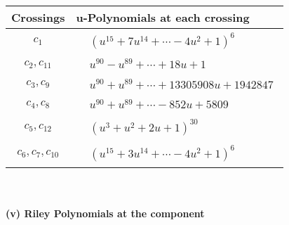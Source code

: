 \documentclass[1p]{elsarticle_modified}
\theoremstyle{definition}
\begin{document}
\begin{tabular}{m{50pt}|m{274pt}}
Crossings & \hspace{64pt}u-Polynomials at each crossing \\
\hline $$\begin{aligned}c_{1}\end{aligned}$$&$\begin{aligned}
&(u^{15}+7 u^{14}+\cdots-4 u^2+1)^{6}
\end{aligned}$\\
\hline $$\begin{aligned}c_{2},c_{11}\end{aligned}$$&$\begin{aligned}
&u^{90}- u^{89}+\cdots+18 u+1
\end{aligned}$\\
\hline $$\begin{aligned}c_{3},c_{9}\end{aligned}$$&$\begin{aligned}
&u^{90}+u^{89}+\cdots+13305908 u+1942847
\end{aligned}$\\
\hline $$\begin{aligned}c_{4},c_{8}\end{aligned}$$&$\begin{aligned}
&u^{90}+u^{89}+\cdots-852 u+5809
\end{aligned}$\\
\hline $$\begin{aligned}c_{5},c_{12}\end{aligned}$$&$\begin{aligned}
&(u^3+u^2+2 u+1)^{30}
\end{aligned}$\\
\hline $$\begin{aligned}c_{6},c_{7},c_{10}\end{aligned}$$&$\begin{aligned}
&(u^{15}+3 u^{14}+\cdots-4 u^2+1)^{6}
\end{aligned}$\\
\hline
\end{tabular}\\~\\
\newpage\renewcommand{\arraystretch}{1}
\flushleft \textbf{(v) Riley Polynomials at the component}\newline \\
\end{document}
